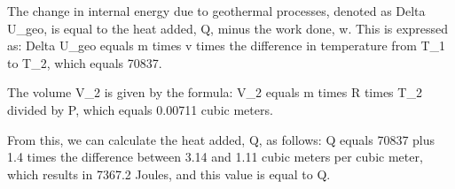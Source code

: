 The change in internal energy due to geothermal processes, denoted as Delta U_geo, is equal to the heat added, Q, minus the work done, w. This is expressed as:
Delta U_geo equals m times v times the difference in temperature from T_1 to T_2, which equals 70837.

The volume V_2 is given by the formula:
V_2 equals m times R times T_2 divided by P, which equals 0.00711 cubic meters.

From this, we can calculate the heat added, Q, as follows:
Q equals 70837 plus 1.4 times the difference between 3.14 and 1.11 cubic meters per cubic meter, which results in 7367.2 Joules, and this value is equal to Q.